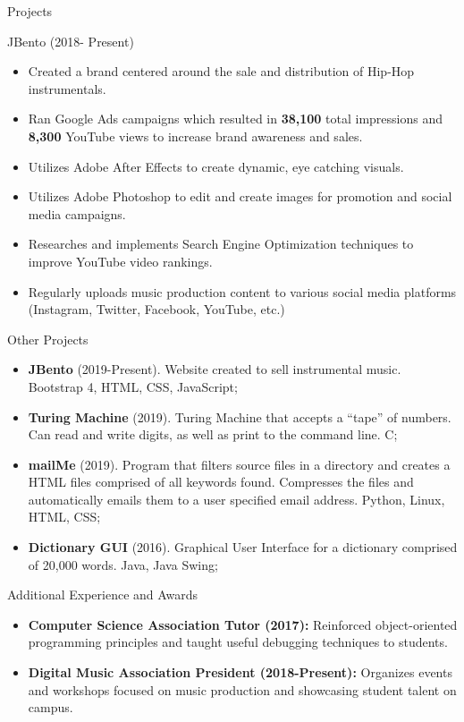 \documentclass[]{johnsoncv}
\begin{document}
	\begin{cvsection}{Projects}
		\begin{cvsubsection}{JBento (2018- Present)}{}{}
			\begin{itemize}
				\item Created a brand centered around the sale and distribution of Hip-Hop instrumentals.
				\item Ran Google Ads campaigns which resulted in \textbf{38,100} total impressions and \textbf{8,300} YouTube views to increase brand awareness and sales.
				\item Utilizes Adobe After Effects to create dynamic, eye catching visuals.
				\item Utilizes Adobe Photoshop to edit and create images for promotion and social media campaigns.
				\item Researches and implements Search Engine Optimization techniques to improve YouTube video rankings.
				\item Regularly uploads music production content to various social media platforms (Instagram, Twitter, Facebook, YouTube, etc.)
			\end{itemize}
	\end{cvsubsection}
		\begin{cvsubsection}{Other Projects}{}{}
			\begin{itemize}
				\item \textbf{JBento} (2019-Present). Website created to sell instrumental music. Bootstrap 4, HTML, CSS, JavaScript;
				\item \textbf{Turing Machine} (2019). Turing Machine that accepts a “tape” of numbers. Can read and write digits, as well as print to the command line. C;
				\item \textbf{mailMe} (2019). Program that filters source files in a directory and creates a HTML files comprised of all keywords found. Compresses the files and automatically emails them to a user specified email address. Python, Linux, HTML, CSS;
				\item \textbf{Dictionary GUI} (2016). Graphical User Interface for a dictionary comprised of 20,000 words. Java, Java Swing;
			\end{itemize}
		\end{cvsubsection}
	\end{cvsection}
	
	\begin{cvsection}{Additional Experience and Awards}
		\begin{cvsubsection}{}{}{}	
			\begin{itemize}
				\item \textbf{Computer Science Association Tutor (2017):} Reinforced object-oriented programming principles and taught useful debugging techniques to students.
				\item \textbf{Digital Music Association President (2018-Present):} Organizes events and workshops focused on music production and showcasing student talent on campus.
			\end{itemize}
		\end{cvsubsection}
	\end{cvsection}
\end{document}

